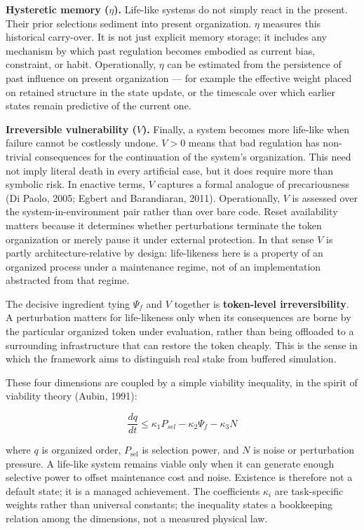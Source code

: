 \documentclass[Afour,sageh,times,doublespace]{sagej}
\begin{document}
\textbf{Hysteretic memory (\(\eta\)).} Life-like systems do not simply react in the present. Their prior selections sediment into present organization. \(\eta\) measures this historical carry-over. It is not just explicit memory storage; it includes any mechanism by which past regulation becomes embodied as current bias, constraint, or habit. Operationally, \(\eta\) can be estimated from the persistence of past influence on present organization --- for example the effective weight placed on retained structure in the state update, or the timescale over which earlier states remain predictive of the current one.

\textbf{Irreversible vulnerability (\(V\)).} Finally, a system becomes more life-like when failure cannot be costlessly undone. \(V > 0\) means that bad regulation has non-trivial consequences for the continuation of the system's organization. This need not imply literal death in every artificial case, but it does require more than symbolic risk. In enactive terms, \(V\) captures a formal analogue of precariousness (Di Paolo, 2005; Egbert and Barandiaran, 2011). Operationally, \(V\) is assessed over the system-in-environment pair rather than over bare code. Reset availability matters because it determines whether perturbations terminate the token organization or merely pause it under external protection. In that sense \(V\) is partly architecture-relative by design: life-likeness here is a property of an organized process under a maintenance regime, not of an implementation abstracted from that regime.

The decisive ingredient tying \(\Psi_f\) and \(V\) together is \textbf{token-level irreversibility}. A perturbation matters for life-likeness only when its consequences are borne by the particular organized token under evaluation, rather than being offloaded to a surrounding infrastructure that can restore the token cheaply. This is the sense in which the framework aims to distinguish real stake from buffered simulation.

These four dimensions are coupled by a simple viability inequality, in the spirit of viability theory (Aubin, 1991):

\[
\frac{dq}{dt} \le \kappa_1 P_{sel} - \kappa_2 \Psi_f - \kappa_3 N
\]

where \(q\) is organized order, \(P_{\mathrm{sel}}\) is selection power, and \(N\) is noise or perturbation pressure. A life-like system remains viable only when it can generate enough selective power to offset maintenance cost and noise. Existence is therefore not a default state; it is a managed achievement. The coefficients \(\kappa_i\) are task-specific weights rather than universal constants; the inequality states a bookkeeping relation among the dimensions, not a measured physical law.
\end{document}
